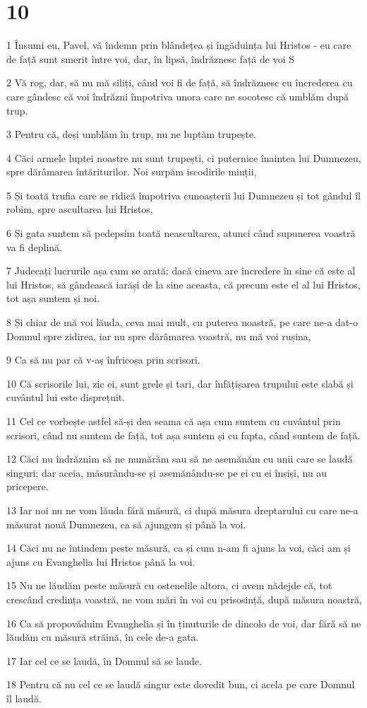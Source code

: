 \chapter{10}

\par 1 Însumi eu, Pavel, vă îndemn prin blândețea și îngăduința lui Hristos - eu care de față sunt smerit între voi, dar, în lipsă, îndrăznesc față de voi S
\par 2 Vă rog, dar, să nu mă siliți, când voi fi de față, să îndrăznesc cu încrederea cu care gândesc că voi îndrăzni împotriva unora care ne socotesc că umblăm după trup.
\par 3 Pentru că, deși umblăm în trup, nu ne luptăm trupește.
\par 4 Căci armele luptei noastre nu sunt trupești, ci puternice înaintea lui Dumnezeu, spre dărâmarea întăriturilor. Noi surpăm iscodirile minții,
\par 5 Și toată trufia care se ridică împotriva cunoașterii lui Dumnezeu și tot gândul îl robim, spre ascultarea lui Hristos,
\par 6 Și gata suntem să pedepsim toată neascultarea, atunci când supunerea voastră va fi deplină.
\par 7 Judecați lucrurile așa cum se arată: dacă cineva are încredere în sine că este al lui Hristos, să gândească iarăși de la sine aceasta, că precum este el al lui Hristos, tot așa suntem și noi.
\par 8 Și chiar de mă voi lăuda, ceva mai mult, cu puterea noastră, pe care ne-a dat-o Domnul spre zidirea, iar nu spre dărâmarea voastră, nu mă voi rușina,
\par 9 Ca să nu par că v-aș înfricoșa prin scrisori.
\par 10 Că scrisorile lui, zic ei, sunt grele și tari, dar înfățișarea trupului este slabă și cuvântul lui este disprețuit.
\par 11 Cel ce vorbește astfel să-și dea seama că așa cum suntem cu cuvântul prin scrisori, când nu suntem de față, tot așa suntem și cu fapta, când suntem de față.
\par 12 Căci nu îndrăznim să ne numărăm sau să ne asemănăm cu unii care se laudă singuri; dar aceia, măsurându-se și asemănându-se pe ei cu ei înșiși, nu au pricepere.
\par 13 Iar noi nu ne vom lăuda fără măsură, ci după măsura dreptarului cu care ne-a măsurat nouă Dumnezeu, ca să ajungem și până la voi.
\par 14 Căci nu ne întindem peste măsură, ca și cum n-am fi ajuns la voi, căci am și ajuns cu Evanghelia lui Hristos până la voi.
\par 15 Nu ne lăudăm peste măsură cu ostenelile altora, ci avem nădejde că, tot crescând credința voastră, ne vom mări în voi cu prisosință, după măsura noastră,
\par 16 Ca să propovăduim Evanghelia și în ținuturile de dincolo de voi, dar fără să ne lăudăm cu măsură străină, în cele de-a gata.
\par 17 Iar cel ce se laudă, în Domnul să se laude.
\par 18 Pentru că nu cel ce se laudă singur este dovedit bun, ci acela pe care Domnul îl laudă.


